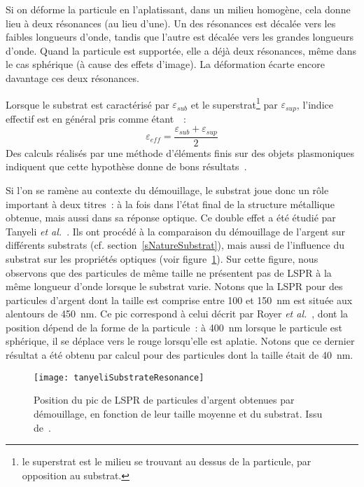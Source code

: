 Si on déforme la particule en l'aplatissant, dans un milieu homogène, cela donne lieu à deux résonances (au lieu d'une). Un des résonances est décalée vers les faibles longueurs d'onde, tandis que l'autre est décalée vers les grandes longueurs d'onde. Quand la particule est supportée, elle a déjà deux résonances, même dans le cas sphérique (à cause des effets d'image). La déformation écarte encore davantage ces deux résonances.\par 
Lorsque le substrat est caractérisé par $\varepsilon_{sub}$ et le superstrat\footnote{le superstrat est le milieu se trouvant au dessus de la particule, par opposition au substrat.} par $\varepsilon_{sup}$, l'indice effectif est en général pris comme étant~\cite{morawiec2013self}~:
\begin{equation}
\varepsilon_{eff} = \dfrac{\varepsilon_{sub}+\varepsilon_{sup}}{2}
\end{equation}
Des calculs réalisés par une méthode d'éléments finis sur des objets plasmoniques indiquent que cette hypothèse donne de bons résultats~\cite{miljkovic2012simulating}.\par 
Si l'on se ramène au contexte du démouillage, le substrat joue donc un rôle important à deux titres~: à la fois dans l'état final de la structure métallique obtenue, mais aussi dans sa réponse optique. Ce double effet a été étudié par Tanyeli \textit{et al.}~\cite{tanyeli2013effect}. Ils ont procédé à la comparaison du démouillage de l'argent sur différents substrats (cf. section~\ref{sNatureSubstrat}), mais aussi de l'influence du substrat sur les propriétés optiques (voir figure~\ref{tanyeliSubstrateResonance}). Sur cette figure, nous observons que des particules de même taille ne présentent pas de LSPR à la même longueur d'onde lorsque le substrat varie. Notons que la LSPR pour des particules d'argent dont la taille est comprise entre 100 et 150~nm est située aux alentours de 450~nm. Ce pic correspond à celui décrit par Royer \textit{et al.}~\cite{royer1987substrate}, dont la position dépend de la forme de la particule~: à 400~nm lorsque le particule est sphérique, il se déplace vers le rouge lorsqu'elle est aplatie. Notons que ce dernier résultat a été obtenu par calcul pour des particules dont la taille était de 40~nm.\par  
\begin{figure}[!htb]
	\centering
	\texttt{[image: tanyeliSubstrateResonance]}
	\caption{Position du pic de LSPR de particules d'argent obtenues par démouillage, en fonction de leur taille moyenne et du substrat. Issu de~\cite{tanyeli2013effect}.}
	\label{tanyeliSubstrateResonance}
\end{figure}
